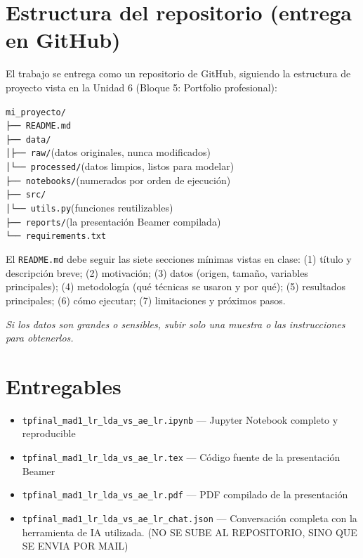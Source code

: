\documentclass[11pt,a4paper]{article}
\newcommand{\codigo}[1]{\texttt{#1}}
\begin{document}
\section{Estructura del repositorio (entrega en GitHub)}
El trabajo se entrega como un repositorio de GitHub, siguiendo la estructura de proyecto vista en la Unidad 6 (Bloque 5: Portfolio profesional):
\begin{center}
\begin{minipage}{0.82\textwidth}
\codigo{mi\_proyecto/}\\
\codigo{\phantom{x}├── README.md}\\
\codigo{\phantom{x}├── data/}\\
\codigo{\phantom{x}│\phantom{xx}├── raw/}\hfill (datos originales, nunca modificados)\\
\codigo{\phantom{x}│\phantom{xx}└── processed/}\hfill (datos limpios, listos para modelar)\\
\codigo{\phantom{x}├── notebooks/}\hfill (numerados por orden de ejecuci\'on)\\
\codigo{\phantom{x}├── src/}\\
\codigo{\phantom{x}│\phantom{xx}└── utils.py}\hfill (funciones reutilizables)\\
\codigo{\phantom{x}├── reports/}\hfill (la presentaci\'on Beamer compilada)\\
\codigo{\phantom{x}└── requirements.txt}
\end{minipage}
\end{center}

El \codigo{README.md} debe seguir las siete secciones m\'inimas vistas en clase: (1) t\'itulo y descripci\'on breve; (2) motivaci\'on; (3) datos (origen, tama\~no, variables principales); (4) metodolog\'ia (qu\'e t\'ecnicas se usaron y por qu\'e); (5) resultados principales; (6) c\'omo ejecutar; (7) limitaciones y pr\'oximos pasos.

\textit{Si los datos son grandes o sensibles, subir solo una muestra o las instrucciones para obtenerlos.}

\section{Entregables}
\begin{itemize}[leftmargin=2em,itemsep=2pt]
    \item \codigo{tpfinal\_mad1\_lr\_lda\_vs\_ae\_lr.ipynb} --- Jupyter Notebook completo y reproducible
    \item \codigo{tpfinal\_mad1\_lr\_lda\_vs\_ae\_lr.tex} --- C\'odigo fuente de la presentaci\'on Beamer
    \item \codigo{tpfinal\_mad1\_lr\_lda\_vs\_ae\_lr.pdf} --- PDF compilado de la presentaci\'on
    \item \codigo{tpfinal\_mad1\_lr\_lda\_vs\_ae\_lr\_chat.json} --- Conversaci\'on completa con la herramienta de IA utilizada. (NO SE SUBE AL REPOSITORIO, SINO QUE SE ENVIA POR MAIL)
\end{itemize}
\end{document}
